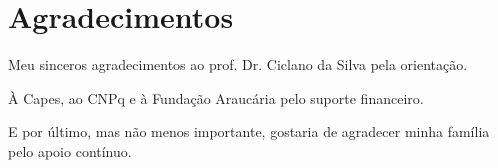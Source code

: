 \chapter*{Agradecimentos}

Meu sinceros agradecimentos ao prof. Dr. Ciclano da Silva pela
orientação.

À Capes, ao CNPq e à Fundação Araucária pelo suporte financeiro. 

E por último, mas não menos importante, gostaria de agradecer minha
família pelo apoio contínuo.
